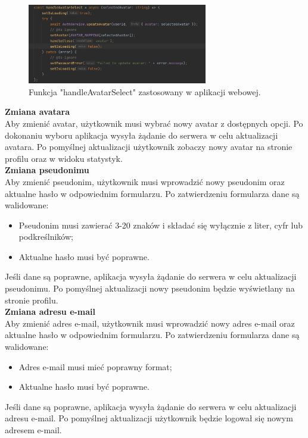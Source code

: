 \begin{figure}[H]
    \centering
    \includegraphics[width=0.7\textwidth]{chapters/chapter_8/screens/edit_user_web}
    \caption{Funkcja "handleAvatarSelect" zastosowany w aplikacji webowej.}
    \label{img:edit_user_web}
\end{figure}

\textbf{Zmiana avatara}\\
Aby zmienić avatar, użytkownik musi wybrać nowy avatar z dostępnych opcji. Po dokonaniu wyboru aplikacja wysyła żądanie do serwera w celu aktualizacji avatara. Po pomyślnej aktualizacji użytkownik zobaczy nowy avatar na stronie profilu oraz w widoku statystyk.\\


\textbf{Zmiana pseudonimu}\\
Aby zmienić pseudonim, użytkownik musi wprowadzić nowy pseudonim oraz aktualne hasło w odpowiednim formularzu. Po zatwierdzeniu formularza dane są walidowane:
\begin{itemize}
    \item Pseudonim musi zawierać 3-20 znaków i składać się wyłącznie z liter, cyfr lub podkreślników;
    \item Aktualne hasło musi być poprawne.
\end{itemize}
Jeśli dane są poprawne, aplikacja wysyła żądanie do serwera w celu aktualizacji pseudonimu. Po pomyślnej aktualizacji nowy pseudonim będzie wyświetlany na stronie profilu.\\


\textbf{Zmiana adresu e-mail}\\
Aby zmienić adres e-mail, użytkownik musi wprowadzić nowy adres e-mail oraz aktualne hasło w odpowiednim formularzu. Po zatwierdzeniu formularza dane są walidowane:
\begin{itemize}
    \item Adres e-mail musi mieć poprawny format;
    \item Aktualne hasło musi być poprawne.
\end{itemize}
Jeśli dane są poprawne, aplikacja wysyła żądanie do serwera w celu aktualizacji adresu e-mail. Po pomyślnej aktualizacji użytkownik będzie logował się nowym adresem e-mail.\\



